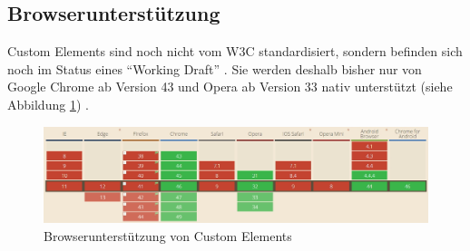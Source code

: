 \subsection{Browserunterstützung}\label{browserunterstuxfctzung}

Custom Elements sind noch nicht vom W3C standardisiert, sondern befinden sich noch im Status eines ``Working Draft'' \cite{citeulike:13845061}. Sie werden deshalb bisher nur von Google Chrome ab Version 43 und Opera ab Version 33 nativ unterstützt (siehe Abbildung \ref{fig:buce}) \cite{citeulike:13844983}.

\begin{figure}[htbp]
 \centering
 \includegraphics[width=\linewidth]{kapitel2/bilder/2-custom-elements-browserunterstuetzung}
 \caption{Browserunterstützung von Custom Elements}
 \label{fig:buce}
\end{figure}
